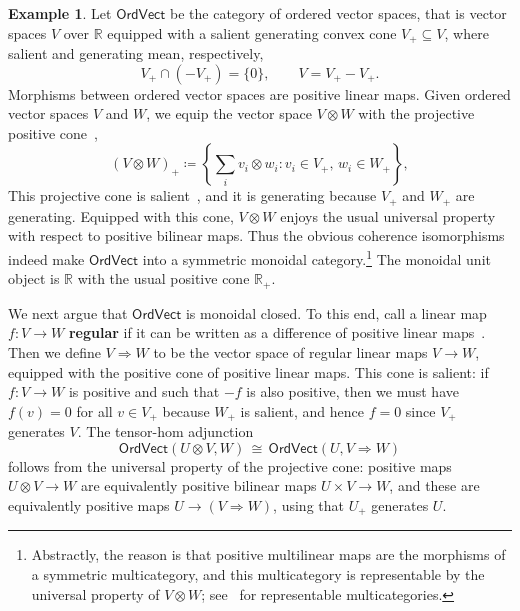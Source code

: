 \documentclass[11pt,onecolumn]{article}
\newcommand{\R}{\mathbb{R}}
\newcommand{\OrdVect}{\mathsf{OrdVect}}
\theoremstyle{plain}
\theoremstyle{remark}
\theoremstyle{definition}
\newtheorem{example}[example]{Example}
\begin{document}
\begin{example}
	Let $\OrdVect$ be the category of ordered vector spaces, that is vector spaces $V$ over $\R$ equipped with a salient generating convex cone $V_+ \subseteq V$,
	where salient and generating mean, respectively,
	\[
		V_+ \cap (-V_+) = \{0\}, \qquad V = V_+ - V_+.
	\]
	Morphisms between ordered vector spaces are positive linear maps.
	Given ordered vector spaces $V$ and $W$, we equip the vector space $V \otimes W$ with the projective positive cone~\cite[1.12]{WittstockOrderedTensor},
	\[
		(V \otimes W)_+ \coloneqq \left\{ \sum_i v_i \otimes w_i : v_i \in V_+, \, w_i \in W_+ \right\},
	\]
	This projective cone is salient~\cite[Theorem~4.8]{WortelLexicographicCones}, and it is generating because $V_+$ and $W_+$ are generating.
	Equipped with this cone, $V \otimes W$ enjoys the usual universal property with respect to positive bilinear maps.
	Thus the obvious coherence isomorphisms indeed make $\OrdVect$ into a symmetric monoidal category.\footnote{Abstractly, the reason is that positive multilinear maps are the morphisms of a symmetric multicategory, and this multicategory is representable by the universal property of $V \otimes W$; see~\cite{HermidaRepresentableMulticategories} for representable multicategories.}
	The monoidal unit object is $\R$ with the usual positive cone $\R_+$.

	We next argue that $\OrdVect$ is monoidal closed.
	To this end, call a linear map $f \colon V \to W$ \textbf{regular} if it can be written as a difference of positive linear maps~\cite[\S 1.4]{AliprantisTourky}.
	Then we define $V \Rightarrow W$ to be the vector space of regular linear maps $V \to W$, equipped with the positive cone of positive linear maps.
	This cone is salient: if $f : V \to W$ is positive and such that $-f$ is also positive, then we must have $f(v) = 0$ for all $v \in V_+$ because $W_+$ is salient,
	and hence $f = 0$ since $V_+$ generates $V$.
	The tensor-hom adjunction
	\[
		\OrdVect(U \otimes V, W) \,\cong\, \OrdVect(U, V \Rightarrow W)
	\]
	follows from the universal property of the projective cone: positive maps $U \otimes V \to W$ are equivalently positive bilinear maps $U \times V \to W$, and these are equivalently positive maps $U \to (V \Rightarrow W)$, using that $U_+$ generates $U$.


\end{example}
\end{document}
